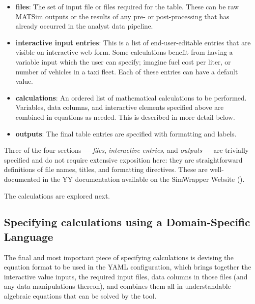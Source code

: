 \documentclass[3p,times,procedia]{elsarticle}
\begin{document}
\begin{itemize}

  \item \textbf{files}: The set of input file or files required for the table. These can be raw MATSim outputs or the results of any pre- or post-processing that has already occurred in the analyst data pipeline.

  \item \textbf{interactive input entries}: This is a list of end-user-editable entries that are visible on interactive web form. Some calculations benefit from having a variable input which the user can specify; imagine fuel cost per liter, or number of vehicles in a taxi fleet. Each of these entries can have a default value.

  \item \textbf{calculations}: An ordered list of mathematical calculations to be performed. Variables, data columns, and interactive elements specified above are combined in equations as needed. This is described in more detail below.

  \item \textbf{outputs}: The final table entries are specified with formatting and labels.

\end{itemize}

Three of the four sections --- \emph{files}, \emph{interactive entries}, and \emph{outputs} --- are trivially specified and do not require extensive exposition here: they are straightforward definitions of file names, titles, and formatting directives. These are well-documented in the YY documentation available on the SimWrapper Website (\cite{SimWrapperWebsite}).

The calculations are explored next.

\subsection{Specifying calculations using a Domain-Specific Language}

The final and most important piece of specifying calculations is devising the equation format to be used in the YAML configuration, which brings together the interactive value inputs, the required input files, data columns in those files (and any data manipulations thereon), and combines them all in understandable algebraic equations that can be solved by the tool.
\end{document}
